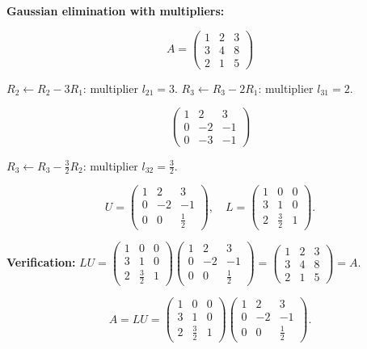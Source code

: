 \documentclass[12pt,a3paper]{article}
\begin{document}
\begin{tcolorbox}[enhanced,breakable,
  colback=cA!4,colframe=cA,boxrule=0.8pt,arc=5pt,
  title={\textbf{Answer --- LU Factorization of $A=\begin{pmatrix}1&2&3\\3&4&8\\2&1&5\end{pmatrix}$}},
  fonttitle=\bfseries\color{white},colbacktitle=cA]
 
\textbf{Gaussian elimination with multipliers:}
 
\[
A = \begin{pmatrix}1&2&3\\3&4&8\\2&1&5\end{pmatrix}
\]
 
$R_2 \leftarrow R_2 - 3R_1$: multiplier $l_{21}=3$.
$R_3 \leftarrow R_3 - 2R_1$: multiplier $l_{31}=2$.
 
\[
\begin{pmatrix}1&2&3\\0&-2&-1\\0&-3&-1\end{pmatrix}
\]
 
$R_3 \leftarrow R_3 - \frac{3}{2}R_2$: multiplier $l_{32}=\frac{3}{2}$.
 
\[
U = \begin{pmatrix}1&2&3\\0&-2&-1\\0&0&\frac{1}{2}\end{pmatrix},\quad
L = \begin{pmatrix}1&0&0\\3&1&0\\2&\frac{3}{2}&1\end{pmatrix}.
\]
 
\textbf{Verification:} $LU = \begin{pmatrix}1&0&0\\3&1&0\\2&\frac{3}{2}&1\end{pmatrix}\begin{pmatrix}1&2&3\\0&-2&-1\\0&0&\frac{1}{2}\end{pmatrix} = \begin{pmatrix}1&2&3\\3&4&8\\2&1&5\end{pmatrix} = A$. \checkmark
 
\[
\boxed{A = LU = \begin{pmatrix}1&0&0\\3&1&0\\2&\frac{3}{2}&1\end{pmatrix}\begin{pmatrix}1&2&3\\0&-2&-1\\0&0&\frac{1}{2}\end{pmatrix}.}
\]
 
\end{tcolorbox}
 
\end{document}
